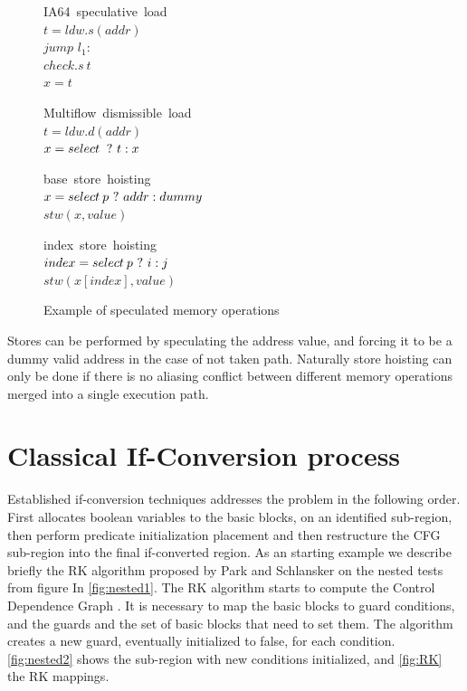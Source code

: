 \begin{figure}
\begin{minipage}[t]{4cm}
\mbox{IA64 speculative load} \\
$t = ldw.s(addr) $ \\
$jump$ $l_1:$ \\
$check.s\:t$ \\
$x = t$ \\
\end{minipage}
\begin{minipage}[t]{4cm}
\mbox{Multiflow dismissible load} \\
$t = ldw.d(addr) $ \\
$x = select\: ~?~ t : x $ \\
\end{minipage}

\begin{minipage}[t]{4cm}
\mbox{base store hoisting} \\
$x=select\:p ~?~ addr : dummy $ \\
$stw (x, value) $ \\
\end{minipage}
\begin{minipage}[t]{4cm}
\mbox{index store hoisting} \\
$index=select\:p ~?~ i : j $ \\
$stw (x[index], value) $ \\
\end{minipage}
\label{fig:spec}
\caption{Example of speculated memory operations}
\end{figure}

Stores can be performed by speculating the address value, and forcing it to be a dummy valid address in the case of not taken path. Naturally store hoisting can only be done if there is no aliasing conflict between different memory operations merged into a single execution path.

\section{Classical If-Conversion process}

Established if-conversion techniques addresses the problem in the following order. First allocates boolean variables to the basic blocks, on an identified sub-region, then perform predicate initialization placement and then restructure the CFG sub-region into the final if-converted region. 
As an starting example we describe briefly the RK algorithm proposed by Park and Schlansker \cite{Schlansker-predicated} on the nested tests from figure In \ref{fig:nested1}. 
The RK algorithm starts to compute the Control Dependence Graph \cite{Ferrante:1987:PDG:24039.24041}. It is necessary to map the basic blocks to guard conditions, and the guards and the set of basic blocks that need to set them. The algorithm creates a new guard, eventually initialized to false, for each condition. \ref{fig:nested2} shows the sub-region with new conditions initialized, and \ref{fig:RK} the RK mappings.


